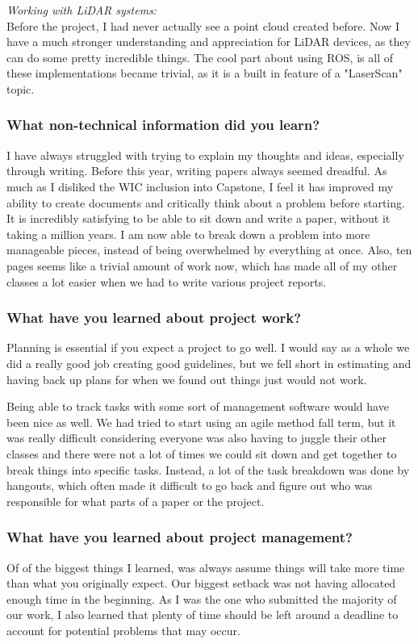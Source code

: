 \documentclass[compsoc,draftclsnofoot,onecolumn,10pt]{IEEEtran}
\begin{document}
\textit{Working with LiDAR systems:\\}
Before the project, I had never actually see a point cloud created before. Now I have a much stronger understanding and appreciation for LiDAR devices, as they can do some pretty incredible things. The cool part about using ROS, is all of these implementations became trivial, as it is a built in feature of a "LaserScan" topic.    

\subsubsection*{What non-technical information did you learn?}
I have always struggled with trying to explain my thoughts and ideas, especially through writing. 
Before this year, writing papers always seemed dreadful. 
As much as I disliked the WIC inclusion into Capstone, I feel it has improved my ability to create documents and critically think about a problem before starting.
It is incredibly satisfying to be able to sit down and write a paper, without it taking a million years.
I am now able to break down a problem into more manageable pieces, instead of being overwhelmed by everything at once. 
Also, ten pages seems like a trivial amount of work now, which has made all of my other classes a lot easier when we had to write various project reports. \par


\subsubsection*{What have you learned about project work?}
Planning is essential if you expect a project to go well. I would say as a whole we did a really good job creating good guidelines, but we fell short in estimating and having back up plans for when we found out things just would not work. 

Being able to track tasks with some sort of management software would have been nice as well. We had tried to start using an agile method fall term, but it was really difficult considering everyone was also having to juggle their other classes and there were not a lot of times we could sit down and get together to break things into specific tasks. Instead, a lot of the task breakdown was done by hangouts, which often made it difficult to go back and figure out who was responsible for what parts of a paper or the project. 

\subsubsection*{What have you learned about project management?}
Of of the biggest things I learned, was always assume things will take more time than what you originally expect. Our biggest setback was not having allocated enough time in the beginning. As I was the one who submitted the majority of our work, I also learned that plenty of time should be left around a deadline to account for potential problems that may occur. 
\end{document}
